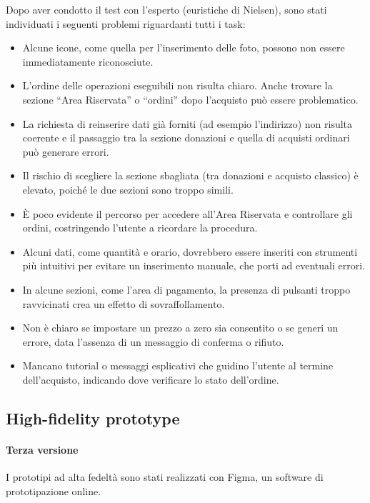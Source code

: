\documentclass{article}
\begin{document}
Dopo aver condotto il test con l'esperto (euristiche di Nielsen), sono stati individuati i seguenti problemi riguardanti tutti i task:
\begin{itemize}
    \item Alcune icone, come quella per l’inserimento delle foto, possono non essere immediatamente riconosciute.
    \item L’ordine delle operazioni eseguibili non risulta chiaro. Anche trovare la sezione “Area Riservata” o “ordini” dopo l’acquisto può essere problematico.
    \item La richiesta di reinserire dati già forniti (ad esempio l’indirizzo) non risulta coerente e il passaggio tra la sezione donazioni e quella di acquisti ordinari può generare errori.
    \item Il rischio di scegliere la sezione sbagliata (tra donazioni e acquisto classico) è elevato, poiché le due sezioni sono troppo simili.
    \item È poco evidente il percorso per accedere all’Area Riservata e controllare gli ordini, costringendo l’utente a ricordare la procedura.
    \item Alcuni dati, come quantità e orario, dovrebbero essere inseriti con strumenti più intuitivi per evitare un inserimento manuale, che porti ad eventuali errori.
    \item In alcune sezioni, come l’area di pagamento, la presenza di pulsanti troppo ravvicinati crea un effetto di sovraffollamento.
    \item Non è chiaro se impostare un prezzo a zero sia consentito o se generi un errore, data l'assenza di un messaggio di conferma o rifiuto.
    \item Mancano tutorial o messaggi esplicativi che guidino l’utente al termine dell’acquisto, indicando dove verificare lo stato dell’ordine.
\end{itemize} 

\subsection{High-fidelity prototype}

\paragraph{Terza versione}
\mbox{}
\newline
I prototipi ad alta fedeltà sono stati realizzati con Figma, un software di prototipazione online.
\end{document}
